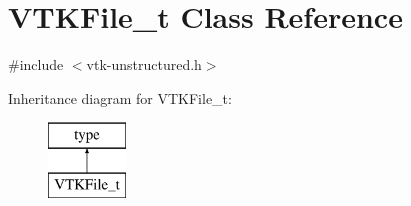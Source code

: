 \hypertarget{classVTKFile__t}{}\section{V\+T\+K\+File\+\_\+t Class Reference}
\label{classVTKFile__t}


{\ttfamily \#include $<$vtk-\/unstructured.\+h$>$}

Inheritance diagram for V\+T\+K\+File\+\_\+t\+:\begin{figure}[H]
\begin{center}
\leavevmode
\includegraphics[height=2.000000cm]{classVTKFile__t}
\end{center}
\end{figure}
